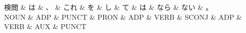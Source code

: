 \documentclass[tikz,border=5pt]{standalone}
\begin{document}
\normalsize
\begin{dependency}[edge unit distance=12.0pt]
    \begin{deptext}[column sep=1em]
        検閲 \& は \& 、 \& これ \& を \& し \& て \& は \& なら \& ない \& 。\\
        NOUN \& ADP \& PUNCT \& PRON \& ADP \& VERB \& SCONJ \& ADP \& VERB \& AUX \& PUNCT\\
    \end{deptext}
\end{dependency}
\end{document}
